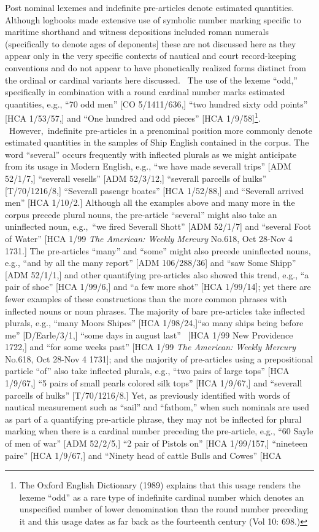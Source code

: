 \begin{styleStandard}
Post nominal lexemes and indefinite pre-articles denote estimated quantities. Although logbooks made extensive use of symbolic number marking specific to maritime shorthand and witness depositions included roman numerals (specifically to denote ages of deponents] these are not discussed here as they appear only in the very specific contexts of nautical and court record-keeping conventions and do not appear to have phonetically realized forms distinct from the ordinal or cardinal variants here discussed. \ The use of the lexeme “odd,” specifically in combination with a round cardinal number marks estimated quantities, e.g., “70 odd men” [CO 5/1411/636,] “two hundred sixty odd points” [HCA 1/53/57,] and “One hundred and odd pieces” [HCA 1/9/58]\footnote{ The Oxford English Dictionary (1989) explains that this usage renders the lexeme “odd” as a rare type of indefinite cardinal number which denotes an unspecified number of lower denomination than the round number preceding it and this usage dates as far back as the fourteenth century (Vol 10: 698.)}. \ However,~indefinite pre-articles in a prenominal position more commonly denote estimated quantities in the samples of Ship English contained in the corpus. The word “several” occurs frequently with inflected plurals as we might anticipate from its usage in Modern English, e.g., “we have made severall trips” [ADM 52/1/7,] “severall vesells” [ADM 52/3/12,] “severall parcells of hulks” [T/70/1216/8,] “Severall pasengr boates” [HCA 1/52/88,] and “Severall arrived men” [HCA 1/10/2.] Although all the examples above and many more in the corpus precede plural nouns, the pre-article “several” might also take an uninflected noun, e.g.,~“we fired Severall Shott” [ADM 52/1/7] and “several Foot of Water” [HCA 1/99 \textit{The American: Weekly Mercury} No.618, Oct 28-Nov 4 1731.] The pre-articles “many” and “some” might also precede uninflected nouns, e.g., “and by all the many report” [ADM 106/288/36] and “saw Some Shipp” [ADM 52/1/1,] and other quantifying pre-articles also showed this trend, e.g., “a pair of shoe” [HCA 1/99/6,] and “a few more shot” [HCA 1/99/14]; yet there are fewer examples of these constructions than the more common phrases with inflected nouns or noun phrases. The majority of bare pre-articles take inflected plurals, e.g., “many Moors Shipes” [HCA 1/98/24,]“so many ships being before me” [D/Earle/3/1,] “some days in august last” ~[HCA 1/99 New Providence 1722,] and “for some weeks past” [HCA 1/99 \textit{The American: Weekly Mercury} No.618, Oct 28-Nov 4 1731]; and the majority of pre-articles using a prepositional particle “of” also take inflected plurals, e.g., “two pairs of large tops” [HCA 1/9/67,] “5 pairs of small pearls colored silk tops” [HCA 1/9/67,] and “severall parcells of hulks” [T/70/1216/8.] Yet, as previously identified with words of nautical measurement such as “sail” and “fathom,” when such nominals are used as part of a quantifying pre-article phrase, they may not be inflected for plural marking when there is a cardinal number preceding the pre-article, e.g., “60 Sayle of men of war” [ADM 52/2/5,] “2 pair of Pistols on” [HCA 1/99/157,] “nineteen paire” [HCA 1/9/67,] and “Ninety head of cattle Bulls and Cowes” [HCA 
\end{styleStandard}
